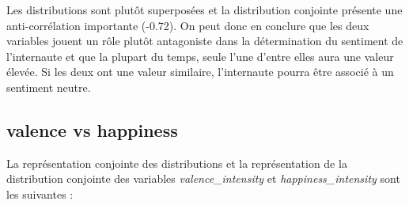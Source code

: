 \documentclass{article}
\begin{document}
Les distributions sont plutôt superposées et la distribution conjointe présente une
anti-corrélation importante (-0.72). On peut donc en conclure que les deux variables jouent
un rôle plutôt antagoniste dans la détermination du sentiment de l'internaute et que
la plupart du temps, seule l'une d'entre elles aura une valeur élevée. Si les deux ont une
valeur similaire, l'internaute pourra être associé à un sentiment neutre.

\subsection*{valence vs happiness}

La représentation conjointe des distributions et la représentation de la
distribution conjointe des variables
\textit{valence\_intensity} et \textit{happiness\_intensity}
sont les suivantes :
\end{document}
